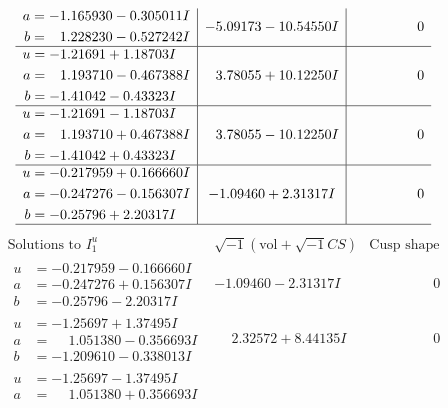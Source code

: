 \documentclass[1p]{elsarticle_modified}
\theoremstyle{definition}
\newcommand{\I}{\sqrt{-1}}
\begin{document}
$$\begin{array}{c|c|c}
\begin{aligned}
a &= -1.165930 - 0.305011 I \\
b &= \phantom{-}1.228230 - 0.527242 I\end{aligned}
 & -5.09173 - 10.54550 I & \phantom{-0.000000 } 0 \\ \hline\begin{aligned}
u &= -1.21691 + 1.18703 I \\
a &= \phantom{-}1.193710 - 0.467388 I \\
b &= -1.41042 - 0.43323 I\end{aligned}
 & \phantom{-}3.78055 + 10.12250 I & \phantom{-0.000000 } 0 \\ \hline\begin{aligned}
u &= -1.21691 - 1.18703 I \\
a &= \phantom{-}1.193710 + 0.467388 I \\
b &= -1.41042 + 0.43323 I\end{aligned}
 & \phantom{-}3.78055 - 10.12250 I & \phantom{-0.000000 } 0 \\ \hline\begin{aligned}
u &= -0.217959 + 0.166660 I \\
a &= -0.247276 - 0.156307 I \\
b &= -0.25796 + 2.20317 I\end{aligned}
 & -1.09460 + 2.31317 I & \phantom{-0.000000 } 0\\
 \hline 
 \end{array}$$\newpage$$\begin{array}{c|c|c}  
\text{Solutions to }I^u_{1}& \I (\text{vol} + \sqrt{-1}CS) & \text{Cusp shape}\\
 \hline 
\begin{aligned}
u &= -0.217959 - 0.166660 I \\
a &= -0.247276 + 0.156307 I \\
b &= -0.25796 - 2.20317 I\end{aligned}
 & -1.09460 - 2.31317 I & \phantom{-0.000000 } 0 \\ \hline\begin{aligned}
u &= -1.25697 + 1.37495 I \\
a &= \phantom{-}1.051380 - 0.356693 I \\
b &= -1.209610 - 0.338013 I\end{aligned}
 & \phantom{-}2.32572 + 8.44135 I & \phantom{-0.000000 } 0 \\ \hline\begin{aligned}
u &= -1.25697 - 1.37495 I \\
a &= \phantom{-}1.051380 + 0.356693 I \\

\end{aligned}
\end{array}$$
\end{document}
